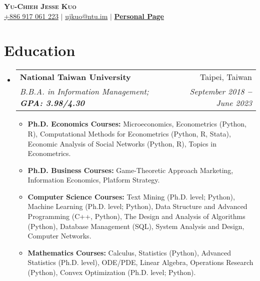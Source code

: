 \documentclass[letterpaper,11pt]{article}
\makeatletter
\newcommand{\resumeItem}[1]{
  \item\small{
    {#1 \vspace{-2pt}}
  }
}
\newcommand{\resumeSubheading}[4]{
  \vspace{-7pt}\item
    \begin{tabular*}{\textwidth}[t]{l@{\extracolsep{\fill}}r}
      \textbf{#1} & #2 \\
      \textit{\small#3} & \textit{\small #4} \\
    \end{tabular*}\vspace{-7pt}
}
\newcommand{\resumeSubHeadingListStart}{\begin{itemize}[leftmargin=0in, label={}]}
\newcommand{\resumeSubHeadingListEnd}{\end{itemize}}
\newcommand{\resumeItemListStart}{\begin{itemize}[leftmargin=0.13in]}
\newcommand{\resumeItemListEnd}{\end{itemize}\vspace{-5pt}}
\makeatother
\begin{document}

\begin{center}
  \textbf{\Huge \scshape Yu-Chieh Jesse Kuo} \\ \vspace{3pt}
    \small
   \hspace{.5pt} \href{tel:886917061223}{+886 917 061 223}
    $|$
    \hspace{.5pt} \href{mailto:ujkuo@ntu.im}{ujkuo@ntu.im}
    $|$
   \hspace{.5pt} \textbf{\href{https://ujkuo.github.io}{Personal Page}}
\end{center}


\section{Education}
  \vspace{1pt}
  \resumeSubHeadingListStart
    
    \resumeSubheading
      {National Taiwan University
      }{Taipei, Taiwan}
      {B.B.A. in Information Management;   \textbf{GPA: 3.98/4.30}}{September 2018 \textbf{--} June 2023}
      \resumeItemListStart
        \resumeItem{\textbf{Ph.D. Economics Courses:}
                Microeconomics, Econometrics (Python, R),
                Computational Methods for Econometrics (Python, R, Stata),
                Economic Analysis of Social Networks (Python, R),
                Topics in Econometrics.}
        \resumeItem{\textbf{Ph.D. Business Courses:}
                Game-Theoretic Approach Marketing,
                Information Economics, Platform Strategy.}
        \resumeItem{\textbf{Computer Science Courses:}
            Text Mining (Ph.D. level; Python),
            Machine Learning (Ph.D. level; Python),
                Data Structure and Advanced Programming (C++, Python),
                The Design and Analysis of Algorithms (Python),
                Database Management (SQL),
                System Analysis and Design,
                Computer Networks.}
        \resumeItem{\textbf{Mathematics Courses:}
                Calculus,
                Statistics (Python),
                Advanced Statistics (Ph.D. level),
                ODE/PDE,
                Linear Algebra,
                Operations Research (Python),
                Convex Optimization (Ph.D. level; Python).}
      \resumeItemListEnd
  \resumeSubHeadingListEnd
\end{document}
